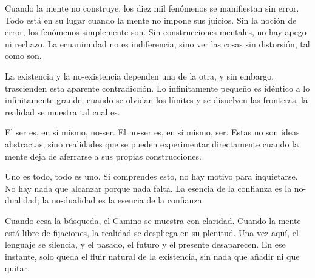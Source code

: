 \documentclass[
  a5paperpaper,
]{article}
\begin{document}
Cuando la mente no construye, los diez mil fenómenos se manifiestan sin
error. Todo está en su lugar cuando la mente no impone sus juicios. Sin
la noción de error, los fenómenos simplemente son. Sin construcciones
mentales, no hay apego ni rechazo. La ecuanimidad no es indiferencia,
sino ver las cosas sin distorsión, tal como son.

La existencia y la no-existencia dependen una de la otra, y sin embargo,
trascienden esta aparente contradicción. Lo infinitamente pequeño es
idéntico a lo infinitamente grande; cuando se olvidan los límites y se
disuelven las fronteras, la realidad se muestra tal cual es.

El ser es, en sí mismo, no-ser. El no-ser es, en sí mismo, ser. Estas no
son ideas abstractas, sino realidades que se pueden experimentar
directamente cuando la mente deja de aferrarse a sus propias
construcciones.

Uno es todo, todo es uno. Si comprendes esto, no hay motivo para
inquietarse. No hay nada que alcanzar porque nada falta. La esencia de
la confianza es la no-dualidad; la no-dualidad es la esencia de la
confianza.

Cuando cesa la búsqueda, el Camino se muestra con claridad. Cuando la
mente está libre de fijaciones, la realidad se despliega en su plenitud.
Una vez aquí, el lenguaje se silencia, y el pasado, el futuro y el
presente desaparecen. En ese instante, solo queda el fluir natural de la
existencia, sin nada que añadir ni que quitar.

\newpage

\begin{center}\textbf{}\end{center}
\end{document}
